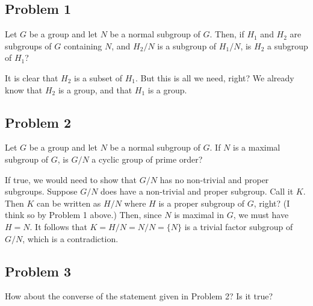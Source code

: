 \documentclass[12pt]{article}
\begin{document}
\subsection*{Problem 1}

Let $G$ be a group and let $N$ be a normal subgroup of $G$.
Then, if $H_1$ and $H_2$ are subgroups of $G$ containing $N$,
and $H_2/N$ is a subgroup of $H_1/N$, is $H_2$ a subgroup of $H_1$?

It is clear that $H_2$ is a subset of $H_1$.  But this is all we need, right?
We already know that $H_2$ is a group, and that $H_1$ is a group.

\subsection*{Problem 2}

Let $G$ be a group and let $N$ be a normal subgroup of $G$.
If $N$ is a maximal subgroup of $G$, is $G/N$ a cyclic group of prime order?

If true, we would need to show that $G/N$ has no non-trivial
and proper subgroups.  Suppose $G/N$ does have a non-trivial
and proper subgroup.  Call it $K$.  Then $K$ can be written as
$H/N$ where $H$ is a proper subgroup of $G$, right?  (I think so by
Problem 1 above.)
Then, since $N$ is maximal in $G$, we must have $H=N$.
It follows that $K=H/N=N/N=\{N\}$ is a trivial factor subgroup of $G/N$, which is a contradiction.

\subsection*{Problem 3}

How about the converse of the statement given in Problem 2?
Is it true?
\end{document}
